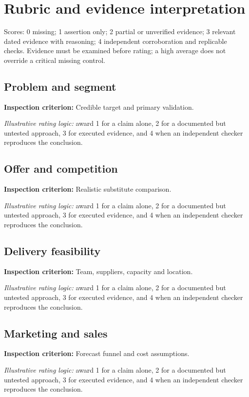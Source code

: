 \documentclass[11pt]{article}
\begin{document}
\SuiteOpen
\section{Rubric and evidence interpretation}
Scores: 0 missing; 1 assertion only; 2 partial or unverified evidence; 3 relevant dated evidence with reasoning; 4 independent corroboration and replicable checks. Evidence must be examined before rating; a high average does not override a critical missing control.
\subsection*{Problem and segment}
\textbf{Inspection criterion:} Credible target and primary validation.\par\textit{Illustrative rating logic:} award 1 for a claim alone, 2 for a documented but untested approach, 3 for executed evidence, and 4 when an independent checker reproduces the conclusion.\par
\subsection*{Offer and competition}
\textbf{Inspection criterion:} Realistic substitute comparison.\par\textit{Illustrative rating logic:} award 1 for a claim alone, 2 for a documented but untested approach, 3 for executed evidence, and 4 when an independent checker reproduces the conclusion.\par
\subsection*{Delivery feasibility}
\textbf{Inspection criterion:} Team, suppliers, capacity and location.\par\textit{Illustrative rating logic:} award 1 for a claim alone, 2 for a documented but untested approach, 3 for executed evidence, and 4 when an independent checker reproduces the conclusion.\par
\subsection*{Marketing and sales}
\textbf{Inspection criterion:} Forecast funnel and cost assumptions.\par\textit{Illustrative rating logic:} award 1 for a claim alone, 2 for a documented but untested approach, 3 for executed evidence, and 4 when an independent checker reproduces the conclusion.\par
\end{document}
